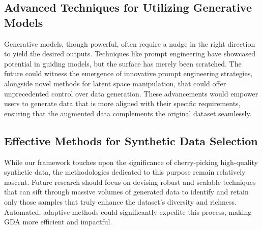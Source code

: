 \documentclass[preprint,12pt,authoryear]{elsarticle}
\begin{document}
\subsection{Advanced Techniques for Utilizing Generative Models}
Generative models, though powerful, often require a nudge in the right direction to yield the desired outputs. Techniques like prompt engineering have showcased potential in guiding models, but the surface has merely been scratched. The future could witness the emergence of innovative prompt engineering strategies, alongside novel methods for latent space manipulation, that could offer unprecedented control over data generation. These advancements would empower users to generate data that is more aligned with their specific requirements, ensuring that the augmented data complements the original dataset seamlessly.

\subsection{Effective Methods for Synthetic Data Selection}
While our framework touches upon the significance of cherry-picking high-quality synthetic data, the methodologies dedicated to this purpose remain relatively nascent. Future research should focus on devising robust and scalable techniques that can sift through massive volumes of generated data to identify and retain only those samples that truly enhance the dataset's diversity and richness. Automated, adaptive methods could significantly expedite this process, making GDA more efficient and impactful.
\end{document}
